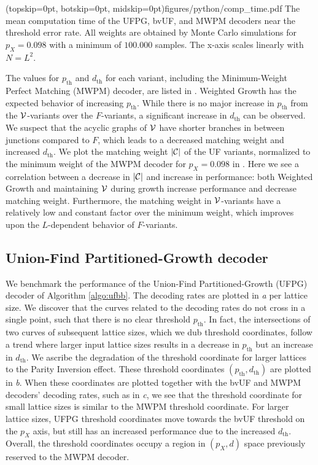\Figure[htb!](topskip=0pt, botskip=0pt, midskip=0pt){figures/python/comp_time.pdf}{
  The mean computation time of the UFPG, bvUF, and MWPM decoders near the threshold error rate. All weights are obtained by Monte Carlo simulations for $p_X=0.098$ with a minimum of $100.000$ samples. The x-axis scales linearly with $N = L^2$.\label{comp_time}}

The values for $p_{\text{th}}$ and $d_{\text{th}}$ for each variant, including the Minimum-Weight Perfect Matching (MWPM) decoder, are listed in . Weighted Growth has the expected behavior of increasing $p_{\text{th}}$. While there is no major increase in $p_{\text{th}}$ from the $\mathcal{V}$-variants over the $F$-variants, a significant increase in $d_{\text{th}}$ can be observed. We suspect that the acyclic graphs of $\mathcal{V}$ have shorter branches in between junctions compared to $F$, which leads to a decreased matching weight and increased $d_{\text{th}}$. We plot the matching weight $\lvert\mathcal{C}\rvert$ of the UF variants, normalized to the minimum weight of the MWPM decoder for $p_X = 0.098$ in . Here we see a correlation between a decrease in $\lvert\mathcal{C}\rvert$ and increase in performance: both Weighted Growth and maintaining $\mathcal{V}$ during growth increase performance and decrease matching weight. Furthermore, the matching weight in $\mathcal{V}$-variants have a relatively low and constant factor over the minimum weight, which improves upon the $L$-dependent behavior of $F$-variants.


\subsection{Union-Find Partitioned-Growth decoder}

We benchmark the performance of the Union-Find Partitioned-Growth (UFPG) decoder of Algorithm \ref{algo:ufbb}. The decoding rates are plotted in \emph{a} per lattice size. We discover that the curves related to the decoding rates do not cross in a single point, such that there is no clear threshold $p_{\text{th}}$. In fact, the intersections of two curves of subsequent lattice sizes, which we dub threshold coordinates, follow a trend where larger input lattice sizes results in a decrease in $p_{\text{th}}$ but an increase in $d_{\text{th}}$. We ascribe the degradation of the threshold coordinate for larger lattices to the Parity Inversion effect. These threshold coordinates $(p_{\text{th}}, d_{\text{th}})$ are plotted in \emph{b}. When these coordinates are plotted together with the bvUF and MWPM decoders' decoding rates, such as in \emph{c}, we see that the threshold coordinate for small lattice sizes is similar to the MWPM threshold coordinate. For larger lattice sizes, UFPG threshold coordinates move towards the bvUF threshold on the $p_X$ axis, but still has an increased performance due to the increased $d_{\text{th}}$. Overall, the threshold coordinates occupy a region in $(p_X, d)$ space previously reserved to the MWPM decoder. 

